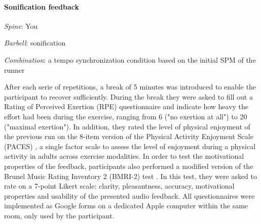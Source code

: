 \documentclass[10pt,letterpaper]{article}
\begin{document}
\paragraph{Sonification feedback}
\begin{description}
\item  \emph{Spine}: You  
\item  \emph{Barbell}: sonification 
\item  \emph{Combination}: a tempo synchronization condition based on the initial SPM of the runner
\end{description}




%
%
%

After each serie of repetitions, a break of 5 minutes was introduced to enable the participant to recover sufficiently. During the break they were asked to fill out a Rating of Perceived Exertion (RPE) questionnaire \cite{borg1998borg} and indicate how heavy the effort had been during the exercise, ranging from 6 ("no exertion at all") to 20 ("maximal exertion"). 
In addition, they rated the level of physical enjoyment of the previous run on the 8-item version of the Physical Activity Enjoyment Scale (PACES) \cite{kendzierski1991physical}, a single factor scale to assess the level of enjoyment during a physical activity in adults across exercise modalities.
In order to test the motivational properties of the feedback, participants also performed a modified version of the Brunel Music Rating Inventory 2 (BMRI-2) test \cite{karageorghis2006redesign}. In this test, they were asked to rate on a 7-point Likert scale: clarity, pleasantness, accuracy, motivational properties and usability of the presented audio feedback. %
All questionnaires were implemented as Google forms on a dedicated Apple computer within the same room, only used by the participant.
\end{document}
